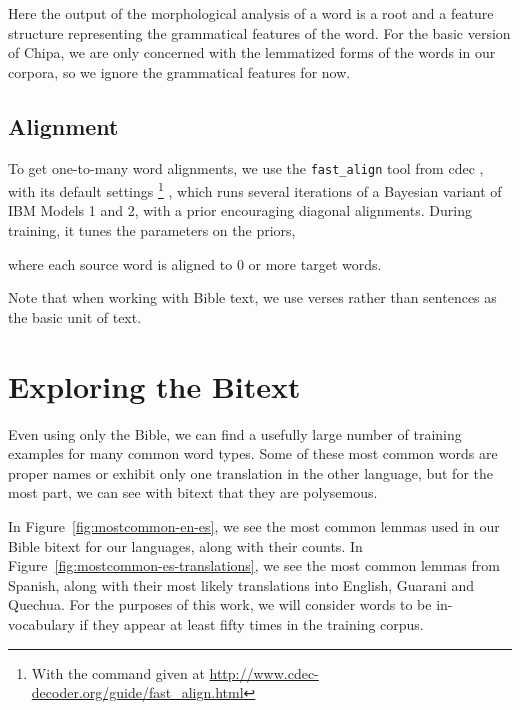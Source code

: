 Here the output of the morphological analysis of a word is a root and a feature
structure representing the grammatical features of the word.  For the basic
version of Chipa, we are only concerned with the lemmatized forms of the words
in our corpora, so we ignore the grammatical features for now.


\subsection{Alignment}
To get one-to-many word alignments, we use the \texttt{fast\_align} tool from
cdec \cite{dyer-EtAl:2010:Demos}, with its default settings
\footnote{With the command given at
\url{http://www.cdec-decoder.org/guide/fast_align.html} }
, which runs several
iterations of a Bayesian variant of IBM Models 1 and 2, with a prior
encouraging diagonal alignments. During training, it tunes the parameters on
the priors, %

where each source word is aligned to 0 or more target words.

Note that when working with Bible text, we use verses rather than sentences as
the basic unit of text.



\section{Exploring the Bitext}
Even using only the Bible, we can find a usefully large number of training
examples for many common word types. Some of these most common words are proper
names or exhibit only one translation in the other language, but for the most
part, we can see with bitext that they are polysemous.

In Figure~\ref{fig:mostcommon-en-es}, we see the most common lemmas used in our
Bible bitext for our languages, along with their counts. In
Figure~\ref{fig:mostcommon-es-translations}, we see the most common lemmas from
Spanish, along with their most likely translations into English, Guarani and
Quechua. For the purposes of this work, we will consider words to be
in-vocabulary if they appear at least fifty times in the training corpus.


